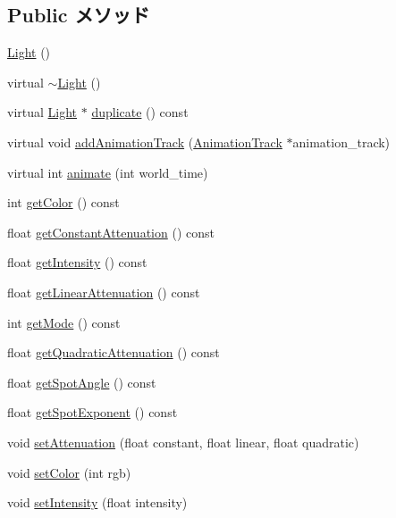 \subsection*{Public メソッド}
\begin{CompactItemize}
\item 
\hyperlink{classm3g_1_1Light_7f8a7be05225f470c200f7e4ff914a3c}{Light} ()
\item 
virtual \hyperlink{classm3g_1_1Light_f50d3d8cdb323e1a9fbd7bfac3aeba06}{$\sim$Light} ()
\item 
virtual \hyperlink{classm3g_1_1Light}{Light} $\ast$ \hyperlink{classm3g_1_1Light_7a41af040d0c1566358d84f089cd0cd1}{duplicate} () const 
\item 
virtual void \hyperlink{classm3g_1_1Light_415c0b110f95410ded9b85e5d99a496b}{addAnimationTrack} (\hyperlink{classm3g_1_1AnimationTrack}{AnimationTrack} $\ast$animation\_\-track)
\item 
virtual int \hyperlink{classm3g_1_1Light_8aad1ceab4c2a03609c8a42324ce484d}{animate} (int world\_\-time)
\item 
int \hyperlink{classm3g_1_1Light_4cfa1931c265ec3412fe3f6408a1b4f5}{getColor} () const 
\item 
float \hyperlink{classm3g_1_1Light_9553ab96cb7639acafcebb81888af687}{getConstantAttenuation} () const 
\item 
float \hyperlink{classm3g_1_1Light_ca846da41d09a6ae01d6b362c33e938d}{getIntensity} () const 
\item 
float \hyperlink{classm3g_1_1Light_50e949b0cc2014e576987379cac07769}{getLinearAttenuation} () const 
\item 
int \hyperlink{classm3g_1_1Light_d4ce4524e4751fe5e3cfb8c270347d54}{getMode} () const 
\item 
float \hyperlink{classm3g_1_1Light_9ec7130ca1977cfeb4b2cbebc31971b4}{getQuadraticAttenuation} () const 
\item 
float \hyperlink{classm3g_1_1Light_1117f914d754fe74c090dc97bde905eb}{getSpotAngle} () const 
\item 
float \hyperlink{classm3g_1_1Light_a359fee191741efb7e576616a59a76f7}{getSpotExponent} () const 
\item 
void \hyperlink{classm3g_1_1Light_391c5cff137fc2e810f5129a5381196f}{setAttenuation} (float constant, float linear, float quadratic)
\item 
void \hyperlink{classm3g_1_1Light_b1f5cc0f5cc6bbbd716a526c61f1081d}{setColor} (int rgb)
\item 
void \hyperlink{classm3g_1_1Light_ce02325cb6289c007d569c193641c468}{setIntensity} (float intensity)

\end{CompactItemize}
